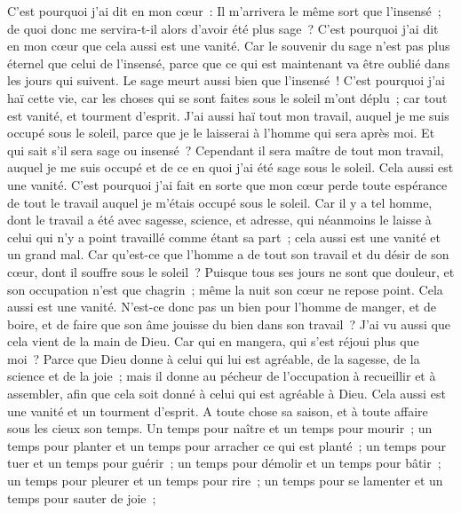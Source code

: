\begin{multicols}{2}
C'est pourquoi j'ai dit en mon cœur~: Il m'arrivera le même sort que l'insensé~; de quoi donc me servira-t-il alors d'avoir été plus sage~? C'est pourquoi j'ai dit en mon cœur que cela aussi est une vanité. 
Car le souvenir du sage n'est pas plus éternel que celui de l'insensé, parce que ce qui est maintenant va être oublié dans les jours qui suivent. Le sage meurt aussi bien que l'insensé~!
C'est pourquoi j'ai haï cette vie, car les choses qui se sont faites sous le soleil m'ont déplu~; car tout est vanité, et tourment d'esprit.
J'ai aussi haï tout mon travail, auquel je me suis occupé sous le soleil, parce que je le laisserai à l'homme qui sera après moi.
Et qui sait s'il sera sage ou insensé~? Cependant il sera maître de tout mon travail, auquel je me suis occupé et de ce en quoi j'ai été sage sous le soleil. Cela aussi est une vanité.
C'est pourquoi j'ai fait en sorte que mon cœur perde toute espérance de tout le travail auquel je m'étais occupé sous le soleil.
Car il y a tel homme, dont le travail a été avec sagesse, science, et adresse, qui néanmoins le laisse à celui qui n'y a point travaillé comme étant sa part~; cela aussi est une vanité et un grand mal. 
Car qu'est-ce que l'homme a de tout son travail et du désir de son cœur, dont il souffre sous le soleil~?
Puisque tous ses jours ne sont que douleur, et son occupation n'est que chagrin~; même la nuit son cœur ne repose point. Cela aussi est une vanité.
N'est-ce donc pas un bien pour l'homme de manger, et de boire, et de faire que son âme jouisse du bien dans son travail~? J'ai vu aussi que cela vient de la main de Dieu.
Car qui en mangera, qui s'est réjoui plus que moi~?
Parce que Dieu donne à celui qui lui est agréable, de la sagesse, de la science et de la joie~; mais il donne au pécheur de l'occupation à recueillir et à assembler, afin que cela soit donné à celui qui est agréable à Dieu. Cela aussi est une vanité et un tourment d'esprit.
\VerseOne{}A toute chose sa saison, et à toute affaire sous les cieux son temps.
Un temps pour naître et un temps pour mourir~; un temps pour planter et un temps pour arracher ce qui est planté~;
un temps pour tuer et un temps pour guérir~; un temps pour démolir et un temps pour bâtir~;
un temps pour pleurer et un temps pour rire~; un temps pour se lamenter et un temps pour sauter de joie~;

\end{multicols}
